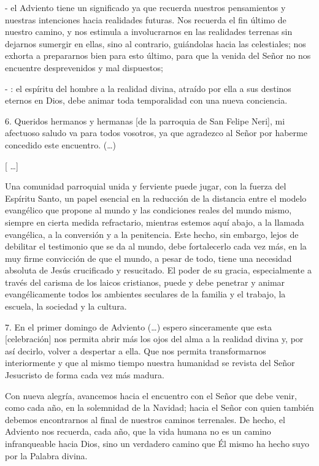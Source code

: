 \begin{body}
	- el Adviento tiene un significado  ya que recuerda nuestros pensamientos y nuestras intenciones hacia realidades futuras. Nos recuerda el fin último de nuestro camino, y nos estimula a involucrarnos en las realidades terrenas sin dejarnos sumergir en ellas, sino al contrario, guiándolas hacia las celestiales; nos exhorta a prepararnos bien para esto último, para que la venida del Señor no nos encuentre desprevenidos y mal dispuestos; 
	
	- : el espíritu del hombre  a la realidad divina, atraído por ella a sus destinos eternos en Dios, debe animar toda temporalidad con una nueva conciencia. 
	
	6. Queridos hermanos y hermanas {[}de la parroquia de San Felipe Neri{]}, mi afectuoso saludo va para todos vosotros, ya que agradezco al Señor por haberme concedido este encuentro. (\ldots{}) 
	
	{[} \ldots{}{]} 
	
	Una comunidad parroquial unida y ferviente puede jugar, con la fuerza del Espíritu Santo, un papel esencial en la reducción de la distancia entre el modelo evangélico que propone al mundo y las condiciones reales del mundo mismo, siempre en cierta medida refractario, mientras estemos aquí abajo, a la llamada evangélica, a la conversión y a la penitencia. Este hecho, sin embargo, lejos de debilitar el testimonio que se da al mundo, debe fortalecerlo cada vez más, en la muy firme convicción de que el mundo, a pesar de todo, tiene una necesidad absoluta de Jesús crucificado y resucitado. El poder de su gracia, especialmente a través del carisma de los laicos cristianos, puede y debe penetrar y animar evangélicamente todos los ambientes seculares de la familia y el trabajo, la escuela, la sociedad y la cultura. 
	
	7. En el primer domingo de Adviento (\ldots{}) espero sinceramente que esta {[}celebración{]} nos permita abrir más los ojos del alma a la realidad divina y, por así decirlo, volver a despertar a ella. Que nos permita transformarnos interiormente y que al mismo tiempo nuestra humanidad se revista del Señor Jesucristo de forma cada vez más madura. 
	
	Con nueva alegría, avancemos hacia el encuentro con el Señor que debe venir, como cada año, en la solemnidad de la Navidad; hacia el Señor con quien también debemos encontrarnos al final de nuestros caminos terrenales. De hecho, el Adviento nos recuerda, cada año, que la vida humana no es un camino infranqueable hacia Dios, sino un verdadero camino que Él mismo ha hecho suyo por la Palabra divina.
\end{body}

